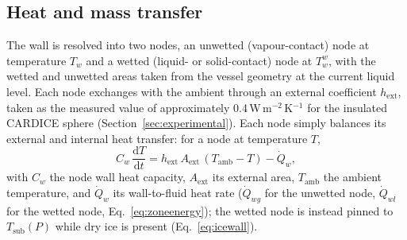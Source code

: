 \documentclass[5p,authoryear]{elsarticle}
\begin{document}
\subsection{Heat and mass transfer}
\label{sec:heat}

The wall is resolved into two nodes, an unwetted (vapour-contact) node at temperature $T_w$ and a
wetted (liquid- or solid-contact) node at $T_w^{w}$, with the wetted and unwetted areas taken from
the vessel geometry at the current liquid level. Each node exchanges with the ambient through an
external coefficient $h_\text{ext}$, taken as the measured value of approximately
0.4\,W\,m$^{-2}$\,K$^{-1}$ for the insulated CARDICE sphere (Section~\ref{sec:experimental}). Each
node simply balances its external and internal heat transfer: for a node at temperature $T$,
\begin{equation}
\label{eq:wallnode}
C_w\,\frac{\mathrm{d}T}{\mathrm{d}t} = h_\text{ext}\,A_\text{ext}\,(T_\text{amb} - T) - \dot Q_w,
\end{equation}
with $C_w$ the node wall heat capacity, $A_\text{ext}$ its external area, $T_\text{amb}$ the ambient
temperature, and $\dot Q_w$ its wall-to-fluid heat rate ($\dot Q_{wg}$ for the unwetted node,
$\dot Q_{wl}$ for the wetted node, Eq.~\eqref{eq:zoneenergy}); the wetted node is instead pinned to
$T_\text{sub}(P)$ while dry ice is present (Eq.~\eqref{eq:icewall}).
\end{document}
